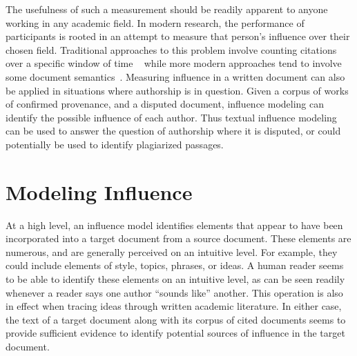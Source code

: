 \documentclass[../ut-dissertation.tex]{subfiles}
\begin{document}
The usefulness of such a measurement should be readily apparent to
anyone working in any academic field.  In modern research, the
performance of participants is rooted in an attempt to measure that
person's influence over their chosen field.  Traditional approaches to
this problem involve counting citations over a specific window of time
~\cite{adler2009} while more modern approaches tend to involve some
document semantics~\cite{dietz2007, jiang2014}. Measuring
influence in a written document can also be applied in situations
where authorship is in question.  Given a corpus of works of confirmed
provenance, and a disputed document, influence modeling can identify
the possible influence of each author.  Thus textual influence
modeling can be used to answer the question of authorship where it is
disputed, or could potentially be used to identify plagiarized
passages.


\section{Modeling Influence}
At a high level, an influence model identifies elements that appear to
have been incorporated into a target document from a source document.
These elements are numerous, and are generally perceived on an
intuitive level.  For example, they could include elements of style,
topics, phrases, or ideas.  A human reader seems to be able to
identify these elements on an intuitive level, as can be seen readily
whenever a reader says one author ``sounds like'' another.  This
operation is also in effect when tracing ideas through written
academic literature.  In either case, the text of a target document
along with its corpus of cited documents seems to provide sufficient
evidence to identify potential sources of influence in the target
document.
\end{document}
